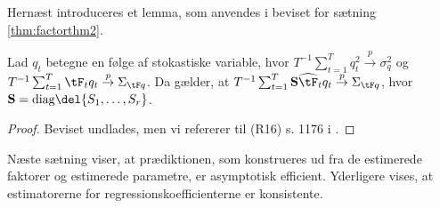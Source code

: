 %
Hernæst introduceres et lemma, som anvendes i beviset for sætning \ref{thm:factorthm2}.
%
\begin{lem} \label{lem:factorlem1}
Lad \(q_t\) betegne en følge af stokastiske variable, hvor \(T^{-1} \sum_{t=1}^T q_t^2 \overset{p}{\rightarrow} \sigma_q^2\) og \(T^{-1} \sum_{t=1}^T \tF_t q_t \overset{p}{\rightarrow} \Sigma_{\tF q}\).
Da gælder, at \(T^{-1} \sum_{t=1}^T \mathbf{S} \widehat{\tF}_t q_t \overset{p}{\rightarrow} \Sigma_{\tF q}\), hvor \(\mathbf{S} = \text{diag} \del{S_1, \ldots, S_r}\).
\end{lem}
\begin{proof}
Beviset undlades, men vi refererer til (R16) s. 1176 i \citep{stock_watson_2002a}.
\end{proof}
%
%
Næste sætning viser, at prædiktionen, som konstrueres ud fra de estimerede faktorer og estimerede parametre, er asymptotisk efficient.
Yderligere vises, at estimatorerne for regressionskoefficienterne er konsistente.


